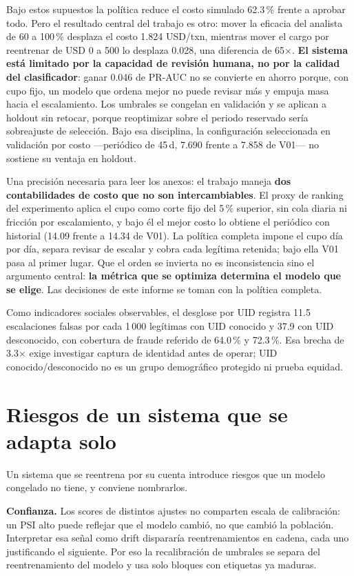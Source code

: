 \documentclass[11pt,letterpaper]{article}
\begin{document}
Bajo estos supuestos la política reduce el costo simulado 62.3\,\% frente a aprobar todo. Pero el resultado central del trabajo es otro: mover la eficacia del analista de 60 a 100\,\% desplaza el costo 1.824 USD/txn, mientras mover el cargo por reentrenar de USD 0 a 500 lo desplaza 0.028, una diferencia de 65$\times$. \textbf{El sistema está limitado por la capacidad de revisión humana, no por la calidad del clasificador}: ganar 0.046 de PR-AUC no se convierte en ahorro porque, con cupo fijo, un modelo que ordena mejor no puede revisar más y empuja masa hacia el escalamiento. Los umbrales se congelan en validación y se aplican a holdout sin retocar, porque reoptimizar sobre el periodo reservado sería sobreajuste de selección. Bajo esa disciplina, la configuración seleccionada en validación por costo —periódico de 45\,d, 7.690 frente a 7.858 de V01— no sostiene su ventaja en holdout. 

Una precisión necesaria para leer los anexos: el trabajo maneja \textbf{dos contabilidades de costo que no son intercambiables}. El proxy de ranking del experimento aplica el cupo como corte fijo del 5\,\% superior, sin cola diaria ni fricción por escalamiento, y bajo él el mejor costo lo obtiene el periódico con historial (14.09 frente a 14.34 de V01). La política completa impone el cupo día por día, separa revisar de escalar y cobra cada legítima retenida; bajo ella V01 pasa al primer lugar. Que el orden se invierta no es inconsistencia sino el argumento central: \textbf{la métrica que se optimiza determina el modelo que se elige}. Las decisiones de este informe se toman con la política completa.

Como indicadores sociales observables, el desglose por UID registra 11.5 escalaciones falsas por cada 1\,000 legítimas con UID conocido y 37.9 con UID desconocido, con cobertura de fraude referido de 64.0\,\% y 72.3\,\%. Esa brecha de 3.3$\times$ exige investigar captura de identidad antes de operar; UID conocido/desconocido no es un grupo demográfico protegido ni prueba equidad.

\section{Riesgos de un sistema que se adapta solo}

Un sistema que se reentrena por su cuenta introduce riesgos que un modelo congelado no tiene, y conviene nombrarlos.

\textbf{Confianza.} Los scores de distintos ajustes no comparten escala de calibración: un PSI alto puede reflejar que el modelo cambió, no que cambió la población. Interpretar esa señal como drift dispararía reentrenamientos en cadena, cada uno justificando el siguiente. Por eso la recalibración de umbrales se separa del reentrenamiento del modelo y usa solo bloques con etiquetas ya maduras.
\end{document}
